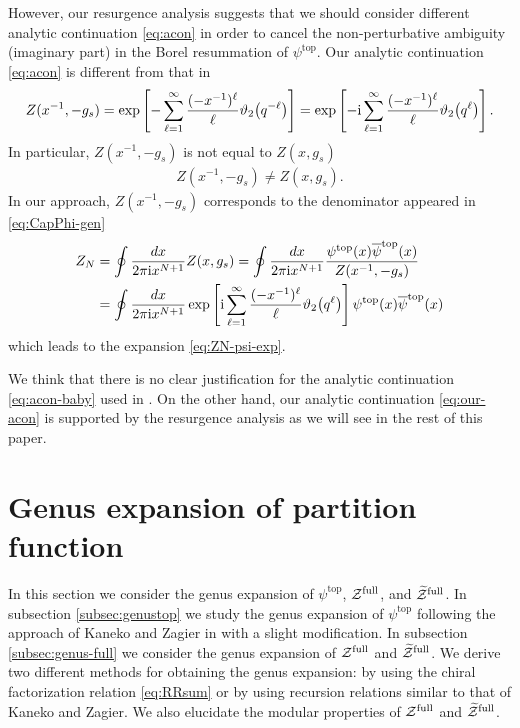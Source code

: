 \documentclass[11pt]{article}
\newcommand{\ri}{{\rm i}}
\def\b#1{\overline{#1}}
\renewcommand{\[}{\begin{eqnarray}}
\renewcommand{\]}{\end{eqnarray}}
\newcommand{\Zefull}{{\cal Z}^{\text{full}}}
\newcommand{\Zofull}{{\widetilde{\cal Z}}^{\text{full}}}
\begin{document}
However, our resurgence analysis suggests that 
we should consider different analytic continuation \eqref{eq:acon}
in order to cancel the non-perturbative ambiguity (imaginary part)
in the Borel resummation of $\psi^{\text{top}}$.
Our analytic continuation \eqref{eq:acon} is different from that in \cite{Dijkgraaf:2005bp}
\begin{align}
 Z(x^{-1},-g_s)= 
\exp\left[-\sum_{\ell=1}^\infty
\frac{(-x^{-1})^{\ell}}{\ell}\vartheta_2\bigl(q^{-\ell}\bigr)\right]=\exp\left[-\ri\sum_{\ell=1}^\infty
\frac{(-x^{-1})^{\ell}}{\ell}\vartheta_2\bigl(q^\ell\bigr)\right].
\label{eq:our-acon}
\end{align}
In particular, $Z(x^{-1},-g_s)$ is not equal to $Z(x,g_s)$
\begin{align}
 Z(x^{-1},-g_s)\ne Z(x,g_s).
\end{align}
In our approach, $Z(x^{-1},-g_s)$
corresponds to the denominator appeared in  \eqref{eq:CapPhi-gen}
\begin{align}
\begin{aligned}
 Z_N&=\oint\frac{dx}{2\pi\ri x^{N+1}}Z(x,g_s)
=\oint\frac{dx}{2\pi\ri x^{N+1}}\frac{\psi^{\text{top}}(x)\b{\psi}^{\text{top}}(x)}{Z(x^{-1},-g_s)}\\
&=\oint\frac{dx}{2\pi\ri x^{N+1}}
\exp\left[\ri\sum_{\ell=1}^\infty
\frac{(-x^{-1})^{\ell}}{\ell}\vartheta_2\bigl(q^\ell\bigr)\right]\psi^{\text{top}}(x)\b{\psi}^{\text{top}}(x) 
\end{aligned}
\end{align}
which leads to the expansion \eqref{eq:ZN-psi-exp}.

We think that there is no clear justification for
the analytic continuation \eqref{eq:acon-baby} used in \cite{Dijkgraaf:2005bp}. 
On the other hand, our analytic continuation  \eqref{eq:our-acon}
is supported by the resurgence analysis as we will see in the rest of this paper.

\section{Genus expansion of partition function\label{sec:genus}}

In this section we consider the genus expansion of
$\psi^{\text{top}}$, $\Zefull$, and $\Zofull$.
In subsection \ref{subsec:genustop}
we study the genus expansion of $\psi^{\text{top}}$
following the approach of Kaneko and Zagier in \cite{zagier}
with a slight modification.
In subsection \ref{subsec:genus-full} we consider
the genus expansion of $\Zefull$ and $\Zofull$.
We derive two different methods for obtaining the genus expansion:
by using the chiral factorization relation \eqref{eq:RRsum}
or by using recursion relations similar to that of Kaneko and Zagier.
We also elucidate the modular properties of $\Zefull$ and $\Zofull$.
\end{document}
